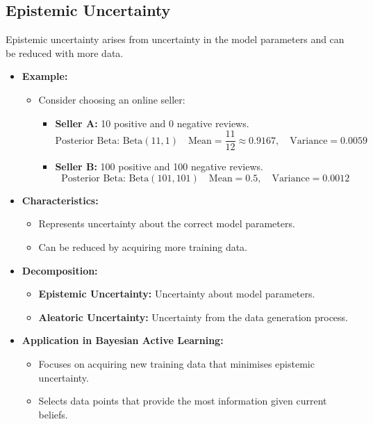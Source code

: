 \subsection{Epistemic Uncertainty}

Epistemic uncertainty arises from uncertainty in the model parameters and can be reduced with more data.

\begin{itemize}
    \item \textbf{Example:}
    \begin{itemize}
        \item Consider choosing an online seller:
        \begin{itemize}
            \item \textbf{Seller A:} 10 positive and 0 negative reviews.
                \[
                \text{Posterior Beta: } \text{Beta}(11, 1) \quad \text{Mean} = \frac{11}{12} \approx 0.9167, \quad \text{Variance} = 0.0059
                \]
            \item \textbf{Seller B:} 100 positive and 100 negative reviews.
                \[
                \text{Posterior Beta: } \text{Beta}(101, 101) \quad \text{Mean} = 0.5, \quad \text{Variance} = 0.0012
                \]
        \end{itemize}
    \end{itemize}
    \item \textbf{Characteristics:}
    \begin{itemize}
        \item Represents uncertainty about the correct model parameters.
        \item Can be reduced by acquiring more training data.
    \end{itemize}
    \item \textbf{Decomposition:}
    \begin{itemize}
        \item \textbf{Epistemic Uncertainty:} Uncertainty about model parameters.
        \item \textbf{Aleatoric Uncertainty:} Uncertainty from the data generation process.
    \end{itemize}
    \item \textbf{Application in Bayesian Active Learning:}
    \begin{itemize}
        \item Focuses on acquiring new training data that minimises epistemic uncertainty.
        \item Selects data points that provide the most information given current beliefs.
    \end{itemize}
\end{itemize}


